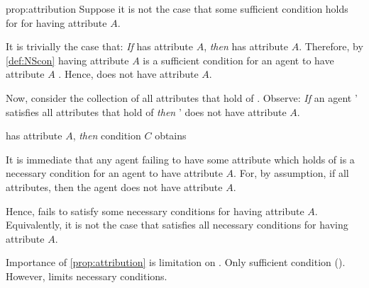 \begin{note}
\begin{argument}{prop:attribution}
    Suppose it is not the case that some sufficient condition holds for \vAgent{} for having attribute \(A\).
    

    It is trivially the case that: \emph{If} \vAgent{} has attribute \(A\), \emph{then} \vAgent{} has attribute \(A\).
    Therefore, by \autoref{def:NScon} having attribute \(A\) is a sufficient condition for an agent to have attribute \(A\) .
    Hence, \vAgent{} does not have attribute \(A\).

    Now, consider the collection of all attributes that hold of \vAgent{}.
    Observe: \emph{If} an agent \vAgent{}' satisfies all attributes that hold of \vAgent{} \emph{then} \vAgent{}' does not have attribute \(A\).
    


    \vAgent{} has attribute \(A\), \emph{then} condition \(C\) obtains




 
    It is immediate that any agent failing to have some attribute which holds of \vAgent{} is a necessary condition for an agent to have attribute \(A\).
    For, by assumption, if all attributes, then the agent does not have attribute \(A\).

    Hence, \vAgent{} fails to satisfy some necessary conditions for having attribute \(A\).
    Equivalently, it is not the case that \vAgent{} satisfies all necessary conditions for having attribute \(A\).
  \end{argument}

\end{note}

\begin{note}
  Importance of \autoref{prop:attribution} is limitation on \ros{}.
  Only sufficient condition (\supportI{}).
  However, \supportII{} limits necessary conditions.
\end{note}

